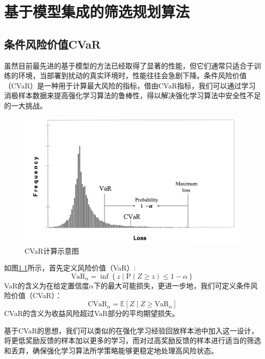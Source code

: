 
\chapter{基于模型集成的筛选规划算法}

\section{条件风险价值CVaR}

虽然目前最先进的基于模型的方法已经取得了显著的性能，但它们通常只适合于训练的环境，当部署到扰动的真实环境时，性能往往会急剧下降。条件风险价值（CVaR）是一种用于计算最大风险的指标，借由CVaR指标，我们可以通过学习消极样本数据来提高强化学习算法的鲁棒性，得以解决强化学习算法中安全性不足的一大挑战。

\begin{figure}
  \centering
  \includegraphics[width=\linewidth]{figures/CVaR.png}
  \caption{CVaR计算示意图}
  \label{fig:cvar}
\end{figure}

如图\ref{fig:cvar}所示，首先定义风险价值（VaR）:
\begin{equation}
    \mathrm{VaR}_\alpha=\inf\left\{z\mid\mathrm{P}(Z\geq z)\leq 1-\alpha\right\}
\end{equation}
VaR的含义为在给定置信度$\alpha$下的最大可能损失，更进一步地，我们可定义条件风险价值（CVaR）：
\begin{equation}
    \mathrm{CVaR}_\alpha = \mathbb{E}\left[Z\mid Z\geq \mathrm{VaR}_\alpha\right]
\end{equation}
CVaR的含义为收益风险超过VaR部分的平均期望损失。

基于CVaR的思想，我们可以类似的在强化学习经验回放样本池中加入这一设计，将更低奖励反馈的样本加以更多的学习，而对过高奖励反馈的样本进行适当的筛选和丢弃，确保强化学习算法所学策略能够更稳定地处理高风险状态。

